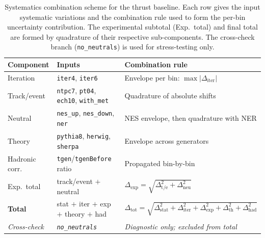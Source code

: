 \begin{table}[t!]
\centering
\small
\begin{tabular}{@{}p{} p{} p{}@{}}
\hline
Component & Inputs & Combination rule \\
\hline
Iteration &
  \texttt{iter4}, \texttt{iter6} &
  Envelope per bin: $\max|\Delta_{\mathrm{iter}}|$ \\
Track/event &
  \texttt{ntpc7}, \texttt{pt04}, \texttt{ech10}, \texttt{with\_met} &
  Quadrature of absolute shifts \\
Neutral &
  \texttt{nes\_up}, \texttt{nes\_down}, \texttt{ner} &
  NES envelope, then quadrature with NER \\
Theory &
  \texttt{pythia8}, \texttt{herwig}, \texttt{sherpa} &
  Envelope across generators \\
Hadronic corr. &
  \texttt{tgen}/\texttt{tgenBefore} ratio &
  Propagated bin-by-bin \\
\hline
Exp.\ total &
  track/event $+$ neutral &
  $\Delta_{\mathrm{exp}}=\sqrt{\Delta_{\mathrm{t/e}}^2+\Delta_{\mathrm{neu}}^2}$ \\
\textbf{Total} &
  stat $+$ iter $+$ exp $+$ theory $+$ had &
  $\Delta_{\mathrm{tot}}=\sqrt{\Delta_{\mathrm{stat}}^2+\Delta_{\mathrm{iter}}^2+\Delta_{\mathrm{exp}}^2+\Delta_{\mathrm{th}}^2+\Delta_{\mathrm{had}}^2}$ \\
\hline
\textit{Cross-check} &
  \textit{\texttt{no\_neutrals}} &
  \textit{Diagnostic only; excluded from total} \\
\hline
\end{tabular}
\normalsize
\caption{Systematics combination scheme for the thrust baseline. Each row gives the input systematic variations and the combination rule used to form the per-bin uncertainty contribution. The experimental subtotal (Exp.\ total) and final total are formed by quadrature of their respective sub-components. The cross-check branch (\texttt{no\_neutrals}) is used for stress-testing only.}
\label{fig:systematics_execution_chart}
\end{table}
